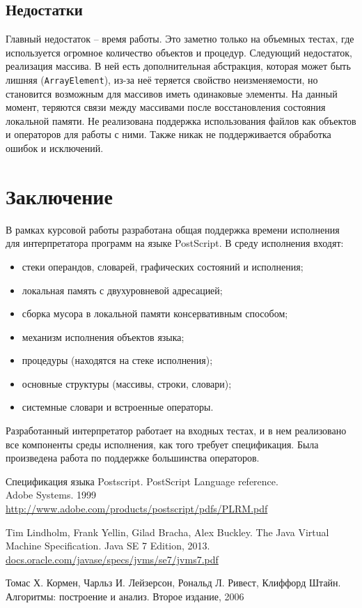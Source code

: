 \documentclass[14pt]{extarticle}
\begin{document}
\subsection{Недостатки}
Главный недостаток -- время работы. Это заметно только на объемных тестах, где используется огромное количество объектов и процедур. Следующий недостаток, реализация массива. В ней есть дополнительная абстракция, которая может быть лишняя (\texttt{ArrayElement}), из-за неё теряется свойство неизменяемости, но становится возможным для массивов иметь одинаковые элементы. На данный момент, теряются связи между массивами после восстановления состояния локальной памяти. Не реализована поддержка использования файлов как объектов и операторов для работы с ними. Также никак не поддерживается обработка ошибок и исключений.

\pagebreak
\section*{Заключение}

В рамках курсовой работы разработана общая поддержка времени исполнения для интерпретатора программ на языке PostScript.
В среду исполнения входят:
\begin{itemize}
\item стеки операндов, словарей, графических состояний и исполнения;
\item локальная память с двухуровневой адресацией;
\item сборка мусора в локальной памяти консервативным способом;
\item механизм исполнения объектов языка;
\item процедуры (находятся на стеке исполнения);
\item основные структуры (массивы, строки, словари);
\item системные словари и встроенные операторы.
\end{itemize}

Разработанный интерпретатор работает на входных тестах, и в нем реализовано все компоненты среды исполнения, как того требует спецификация. Была произведена работа по поддержке большинства операторов.

\pagebreak



\begin{thebibliography}{}

Спецификация языка Postscript. PostScript Language reference. \\
Adobe Systems. 1999\\
\url{http://www.adobe.com/products/postscript/pdfs/PLRM.pdf}

Tim Lindholm, Frank Yellin, Gilad Bracha, Alex Buckley.
The Java Virtual Machine Specification.
Java SE 7 Edition, 2013. \\
\url{docs.oracle.com/javase/specs/jvms/se7/jvms7.pdf}

 Томас Х. Кормен, Чарльз И. Лейзерсон, Рональд Л. Ривест, Клиффорд Штайн.
Алгоритмы: построение и анализ.
Второе издание, 2006

\end{thebibliography}
\end{document}

